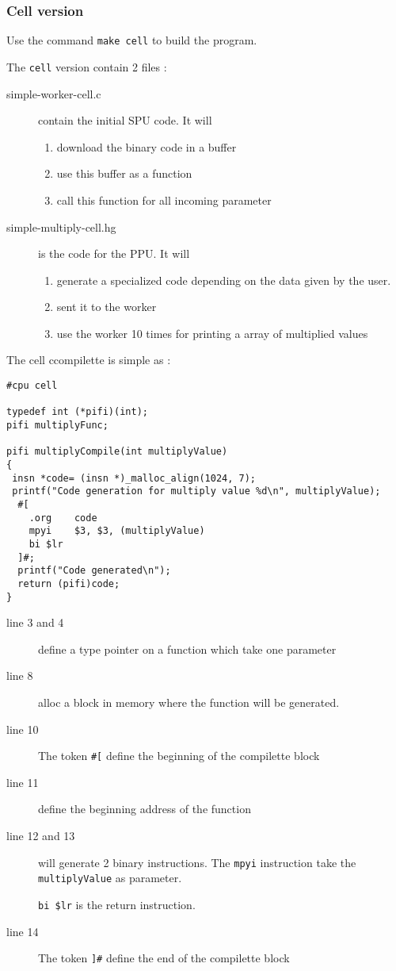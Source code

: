 \documentclass{article}
\begin{document}
\subsubsection{Cell version}

Use the command \texttt{make cell} to build the program.

The \texttt{cell} version contain 2 files :
\begin{description}
\item[simple-worker-cell.c] contain the initial SPU code. It will
  \begin{enumerate}
  \item download the binary code in a buffer
  \item use this buffer as a function
  \item call this function for all incoming parameter
  \end{enumerate}
\item[simple-multiply-cell.hg] is the code for the PPU. It will
  \begin{enumerate}
  \item generate a specialized code depending on the data given by the user.
  \item sent it to the worker
  \item use the worker 10 times for printing a array of multiplied values
  \end{enumerate}
\end{description}

The cell ccompilette is simple as :

\begin{lstlisting}
#cpu cell

typedef int (*pifi)(int);
pifi multiplyFunc; 

pifi multiplyCompile(int multiplyValue)
{
 insn *code= (insn *)_malloc_align(1024, 7);
 printf("Code generation for multiply value %d\n", multiplyValue);
  #[
	.org	code
	mpyi    $3, $3, (multiplyValue) 
	bi $lr 
  ]#;
  printf("Code generated\n");
  return (pifi)code;
}
\end{lstlisting} %

\begin{description}
\item[line 3 and 4] define a type pointer on a function which take one
  parameter
\item[line 8] alloc a block in memory where the function will be generated.
\item[line 10] The token \verb|#[| define the beginning of the
  compilette block
\item[line 11] define the beginning address of the function
\item[line 12 and 13] will generate 2 binary instructions. The
  \texttt{mpyi} instruction take the \texttt{multiplyValue} as
  parameter.

  \texttt{bi \$lr} is the return instruction.

\item[line 14] The token \verb|]#| define the end of the compilette block
\end{description}
\end{document}

